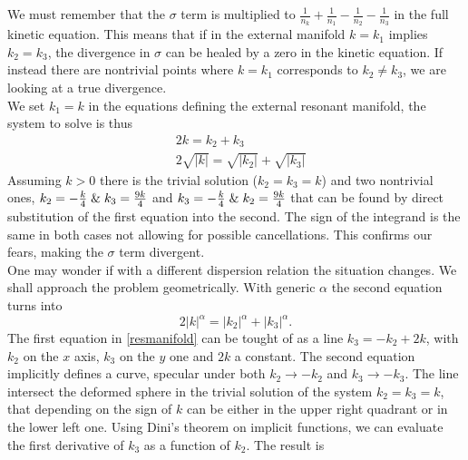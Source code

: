     We must remember that the $\sigma$ term is multiplied to $\frac{1}{n_k} + \frac{1}{n_1} -\frac{1}{n_2} -\frac{1}{n_3}$ in the full kinetic equation. This means that if in the external manifold $k = k_1$ implies $k_2 = k_3$, the divergence in $\sigma$ can be healed by a zero in the kinetic equation. If instead there are nontrivial points where $k=k_1$ corresponds to $k_2 \neq k_3$, we are looking at a true divergence.\\
    We set $k_1=k$ in the equations defining the external resonant manifold, the system to solve is thus
    \begin{equation}
        \begin{aligned}
            &2k = k_2 + k_3 \\
            &2\sqrt{|k|} = \sqrt{|k_2|} + \sqrt{|k_3|}
        \end{aligned}
        \label{resmanifold}
    \end{equation}
    Assuming $k>0$ there is the trivial solution ($k_2 = k_3 = k$) and two nontrivial ones,
    $k_2 = -\frac{k}{4} \hspace{1mm} \& \hspace{1mm}k_3 = \frac{9k}{4} $ and $k_3 = -\frac{k}{4} \hspace{1mm}\& \hspace{1mm}k_2 = \frac{9k}{4} $ that can be found by direct substitution of the first equation into the second. The sign of the integrand is the same in both cases not allowing for possible cancellations.  This confirms our fears, making the $\sigma$ term divergent.\\
    One may wonder if with a different dispersion relation the situation changes. We shall approach the problem geometrically.
    With generic $\alpha$ the second equation turns into 
    \begin{equation}
      2|k|^{\alpha} = |k_2|^{\alpha} +|k_3|^{\alpha}.
      \label{frequency}
    \end{equation} 
    The first equation in \eqref{resmanifold} can be tought of as a line $k_3 = -k_2 + 2k$, with $k_2$ on the $x$ axis, $k_3$ on the $y$ one and $2k$ a constant. The second equation implicitly defines  a curve, specular under both $k_2 \rightarrow -k_2$ and $k_3 \rightarrow -k_3$. The line intersect the deformed sphere in the trivial solution of the system $k_2 = k_3 = k$, that depending on the sign of $k$ can be either in the upper right quadrant or in the lower left one. Using Dini's theorem on implicit functions, we can evaluate the first derivative of $k_3$ as a function of $k_2$. The result is 
